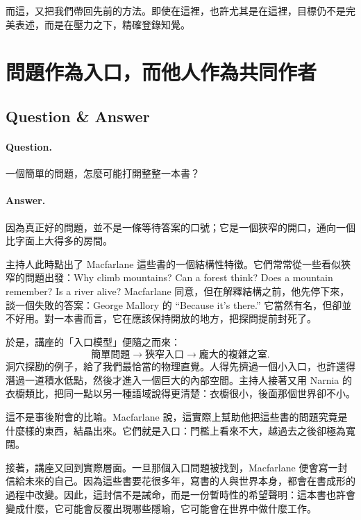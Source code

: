 而這，又把我們帶回先前的方法。即使在這裡，也許尤其是在這裡，目標仍不是完美表述，而是在壓力之下，精確登錄知覺。

\section{問題作為入口，而他人作為共同作者}

\subsection{Question \& Answer}

\paragraph{Question.} 一個簡單的問題，怎麼可能打開整整一本書？

\paragraph{Answer.} 因為真正好的問題，並不是一條等待答案的口號；它是一個狹窄的開口，通向一個比字面上大得多的房間。

主持人此時點出了 Macfarlane 這些書的一個結構性特徵。它們常常從一些看似狹窄的問題出發：Why climb mountains? Can a forest think? Does a mountain remember? Is a river alive? Macfarlane 同意，但在解釋結構之前，他先停下來，談一個失敗的答案：George Mallory 的 ``Because it's there.'' 它當然有名，但卻並不好用。對一本書而言，它在應該保持開放的地方，把探問提前封死了。

於是，講座的「入口模型」便隨之而來：
\begin{equation}
\text{簡單問題} \longrightarrow \text{狹窄入口} \longrightarrow \text{龐大的複雜之室}.
\end{equation}
洞穴探勘的例子，給了我們最恰當的物理直覺。人得先擠過一個小入口，也許還得潛過一道積水低點，然後才進入一個巨大的內部空間。主持人接著又用 Narnia 的衣櫥類比，把同一點以另一種語域說得更清楚：衣櫥很小，後面那個世界卻不小。

這不是事後附會的比喻。Macfarlane 說，這實際上幫助他把這些書的問題究竟是什麼樣的東西，結晶出來。它們就是入口：門檻上看來不大，越過去之後卻極為寬闊。

接著，講座又回到實際層面。一旦那個入口問題被找到，Macfarlane 便會寫一封信給未來的自己。因為這些書要花很多年，寫書的人與世界本身，都會在書成形的過程中改變。因此，這封信不是誡命，而是一份暫時性的希望聲明：這本書也許會變成什麼，它可能會反覆出現哪些隱喻，它可能會在世界中做什麼工作。

